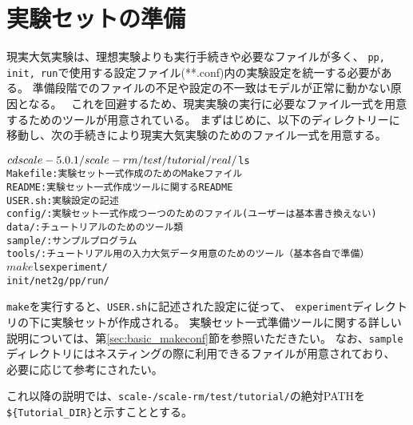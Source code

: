 \section{実験セットの準備} \label{sec:tutrial_real_prep}

現実大気実験は、理想実験よりも実行手続きや必要なファイルが多く、
\verb|pp, init, run|で使用する設定ファイル(**.conf)内の実験設定を統一する必要がある。
準備段階でのファイルの不足や設定の不一致はモデルが正常に動かない原因となる。　
これを回避するため、現実実験の実行に必要なファイル一式を用意するためのツールが用意されている。
まずはじめに、以下のディレクトリーに移動し、次の手続きにより現実大気実験のためのファイル一式を用意する。
\begin{alltt}
 $ cd scale-{\version}/scale-rm/test/tutorial/real/
 $ ls 
    Makefile : 実験セット一式作成のためのMakeファイル
    README   : 実験セット一式作成ツールに関するREADME
    USER.sh  : 実験設定の記述
    config/  : 実験セット一式作成つーつのためのファイル(ユーザーは基本書き換えない)
    data/    : チュートリアルのためのツール類
    sample/  : サンプルプログラム
    tools/   : チュートリアル用の入力大気データ用意のためのツール（基本各自で準備）
 $ make
 $ ls experiment/
   init/  net2g/  pp/  run/
\end{alltt}
\verb|make|を実行すると、\verb|USER.sh|に記述された設定に従って、
\verb|experiment|ディレクトリの下に実験セットが作成される。
実験セット一式準備ツールに関する詳しい説明については、第\ref{sec:basic_makeconf}節を参照いただきたい。
なお、\verb|sample|ディレクトリにはネスティングの際に利用できるファイルが用意されており、
必要に応じて参考にされたい。

これ以降の説明では、\texttt{scale-{\version}/scale-rm/test/tutorial/}の絶対PATHを
\verb|${Tutorial_DIR}|と示すこととする。

